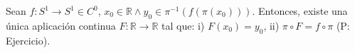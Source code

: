\begin{proposicion}
	Sean $f: S^1 \to S^1 \in C^0$, $x_0 \in \mathbb{R} \land y_0 \in \pi^{-1}(f(\pi(x_0)))$. Entonces, existe una única aplicación continua $F: \mathbb{R} \to \mathbb{R}$ tal que: 
	i) $F(x_0) = y_0$, 
	ii) $\pi \circ F = f \circ \pi$ (P: Ejercicio).
\end{proposicion}
